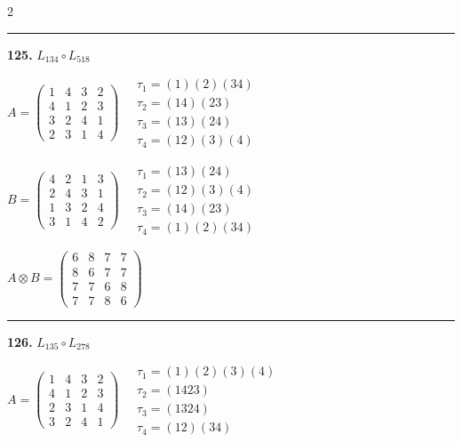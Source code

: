 \begin{multicols}{2}
\vspace{0.3em}
\hrule
\vspace{0.3em}

\noindent\textbf{125.} $L_{134} \circ L_{518}$

$A = \begin{pmatrix} 1 & 4 & 3 & 2 \\ 4 & 1 & 2 & 3 \\ 3 & 2 & 4 & 1 \\ 2 & 3 & 1 & 4 \end{pmatrix} \quad \begin{matrix} \tau_{1}=(1)(2)(3 4) \\ \tau_{2}=(1 4)(2 3) \\ \tau_{3}=(1 3)(2 4) \\ \tau_{4}=(1 2)(3)(4) \end{matrix}$

$B = \begin{pmatrix} 4 & 2 & 1 & 3 \\ 2 & 4 & 3 & 1 \\ 1 & 3 & 2 & 4 \\ 3 & 1 & 4 & 2 \end{pmatrix} \quad \begin{matrix} \tau_{1}=(1 3)(2 4) \\ \tau_{2}=(1 2)(3)(4) \\ \tau_{3}=(1 4)(2 3) \\ \tau_{4}=(1)(2)(3 4) \end{matrix}$

$A \otimes B = \begin{pmatrix} 6 & 8 & 7 & 7 \\ 8 & 6 & 7 & 7 \\ 7 & 7 & 6 & 8 \\ 7 & 7 & 8 & 6 \end{pmatrix}$

\vspace{0.3em}
\hrule
\vspace{0.3em}

\noindent\textbf{126.} $L_{135} \circ L_{278}$

$A = \begin{pmatrix} 1 & 4 & 3 & 2 \\ 4 & 1 & 2 & 3 \\ 2 & 3 & 1 & 4 \\ 3 & 2 & 4 & 1 \end{pmatrix} \quad \begin{matrix} \tau_{1}=(1)(2)(3)(4) \\ \tau_{2}=(1 4 2 3) \\ \tau_{3}=(1 3 2 4) \\ \tau_{4}=(1 2)(3 4) \end{matrix}$


\end{multicols}
